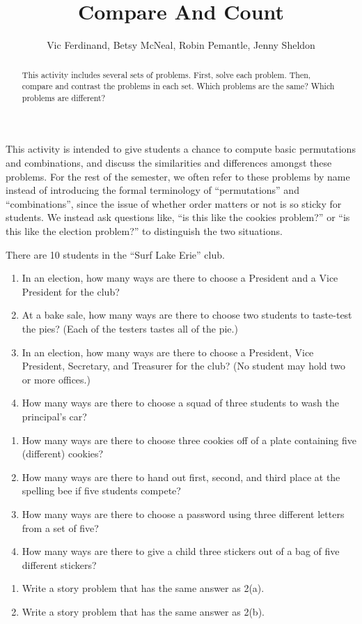 \documentclass{ximera}
\title{Compare And Count}
\author{Vic Ferdinand, Betsy McNeal, Robin Pemantle, Jenny Sheldon}
\begin{document}
\begin{abstract}
This activity includes several sets of problems.  First, solve each problem.  Then, compare and contrast the problems in each set.  Which problems are the same?  Which problems are different?
\end{abstract}
\maketitle

\begin{instructorIntro}
This activity is intended to give students a chance to compute basic permutations and combinations, and discuss the similarities and differences amongst these problems.  For the rest of the semester, we often refer to these problems by name instead of introducing the formal terminology of ``permutations'' and ``combinations'', since the issue of whether order matters or not is so sticky for students.  We instead ask questions like, ``is this like the cookies problem?'' or ``is this like the election problem?'' to distinguish the two situations.

\end{instructorIntro}

\begin{problem}
There are 10 students in the ``Surf Lake Erie'' club.
\begin{enumerate}
\item In an election, how many ways are there to choose a President and a Vice President for the club?
\item At a bake sale, how many ways are there to choose two students to taste-test the pies? (Each of the testers tastes all of the pie.)
\item In an election, how many ways are there to choose a President, Vice President, Secretary, and Treasurer for the club?  (No student may hold two or more offices.)
\item How many ways are there to choose a squad of three students to wash the principal's car?

\end{enumerate}
\end{problem}

\begin{problem}
\begin{enumerate}
\item How many ways are there to choose three cookies off of a plate containing five (different) cookies?
\item How many ways are there to hand out first, second, and third place at the spelling bee if five students compete?
\item How many ways are there to choose a password using three different letters from a set of five?
\item How many ways are there to give a child three stickers out of a bag of five different stickers?
\end{enumerate}
\end{problem}


\begin{problem}
\begin{enumerate}
\item Write a story problem that has the same answer as 2(a).
\item Write a story problem that has the same answer as 2(b).
\end{enumerate}
\end{problem}
\end{document}
